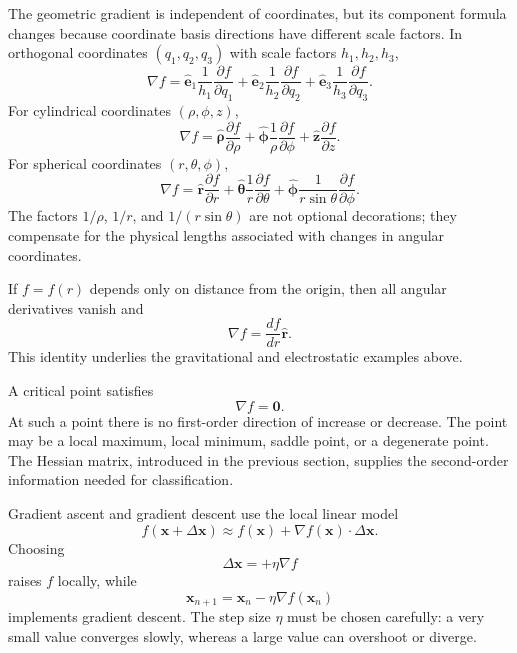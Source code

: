 
The geometric gradient is independent of coordinates, but its component formula changes because coordinate basis directions have different scale factors. In orthogonal coordinates $(q_1,q_2,q_3)$ with scale factors $h_1,h_2,h_3$,
\[
\boxed{
\nabla f
=
\hat{\mathbf e}_1\frac{1}{h_1}\frac{\partial f}{\partial q_1}
+
\hat{\mathbf e}_2\frac{1}{h_2}\frac{\partial f}{\partial q_2}
+
\hat{\mathbf e}_3\frac{1}{h_3}\frac{\partial f}{\partial q_3}.
}
\]
For cylindrical coordinates $(\rho,\phi,z)$,
\[
\nabla f
=
\hat{\boldsymbol\rho}\frac{\partial f}{\partial\rho}
+
\hat{\boldsymbol\phi}\frac{1}{\rho}\frac{\partial f}{\partial\phi}
+
\hat{\mathbf z}\frac{\partial f}{\partial z}.
\]
For spherical coordinates $(r,\theta,\phi)$,
\[
\nabla f
=
\hat{\mathbf r}\frac{\partial f}{\partial r}
+
\hat{\boldsymbol\theta}\frac{1}{r}\frac{\partial f}{\partial\theta}
+
\hat{\boldsymbol\phi}\frac{1}{r\sin\theta}\frac{\partial f}{\partial\phi}.
\]
The factors $1/\rho$, $1/r$, and $1/(r\sin\theta)$ are not optional decorations; they compensate for the physical lengths associated with changes in angular coordinates.

\begin{bookexample}
If $f=f(r)$ depends only on distance from the origin, then all angular derivatives vanish and
\[
\boxed{\nabla f=\frac{df}{dr}\hat{\mathbf r}.}
\]
This identity underlies the gravitational and electrostatic examples above.
\end{bookexample}


A critical point satisfies
\[
\nabla f=\mathbf0.
\]
At such a point there is no first-order direction of increase or decrease. The point may be a local maximum, local minimum, saddle point, or a degenerate point. The Hessian matrix, introduced in the previous section, supplies the second-order information needed for classification.

Gradient ascent and gradient descent use the local linear model
\[
f(\mathbf x+\Delta\mathbf x)
\approx
f(\mathbf x)+\nabla f(\mathbf x)\cdot\Delta\mathbf x.
\]
Choosing
\[
\Delta\mathbf x=+\eta\nabla f
\]
raises $f$ locally, while
\[
\boxed{\mathbf x_{n+1}=\mathbf x_n-\eta\nabla f(\mathbf x_n)}
\]
implements gradient descent. The step size $\eta$ must be chosen carefully: a very small value converges slowly, whereas a large value can overshoot or diverge.


